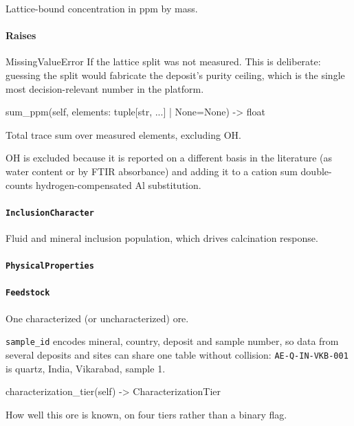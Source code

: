 \documentclass[10pt,a4paper,twoside]{report}
\begin{document}
Lattice-bound concentration in ppm by mass.

\paragraph*{Raises}

MissingValueError If the lattice split was not measured. This is deliberate: guessing the split would fabricate the deposit's purity ceiling, which is the single most decision-relevant number in the platform.

\begin{verbatimsmall}
sum_ppm(self, elements: tuple[str, ...] | None=None) -> float
\end{verbatimsmall}

Total trace sum over measured elements, excluding OH.

OH is excluded because it is reported on a different basis in the literature (as water content or by FTIR absorbance) and adding it to a cation sum double-counts hydrogen-compensated Al substitution.

\paragraph{\texttt{InclusionCharacter}}

Fluid and mineral inclusion population, which drives calcination response.

\paragraph{\texttt{PhysicalProperties}}

\paragraph{\texttt{Feedstock}}

One characterized (or uncharacterized) ore.

\texttt{sample\_id} encodes mineral, country, deposit and sample number, so data from several deposits and sites can share one table without collision: \texttt{AE-Q-IN-VKB-001} is quartz, India, Vikarabad, sample 1.

\begin{verbatimsmall}
characterization_tier(self) -> CharacterizationTier
\end{verbatimsmall}

How well this ore is known, on four tiers rather than a binary flag.
\end{document}
